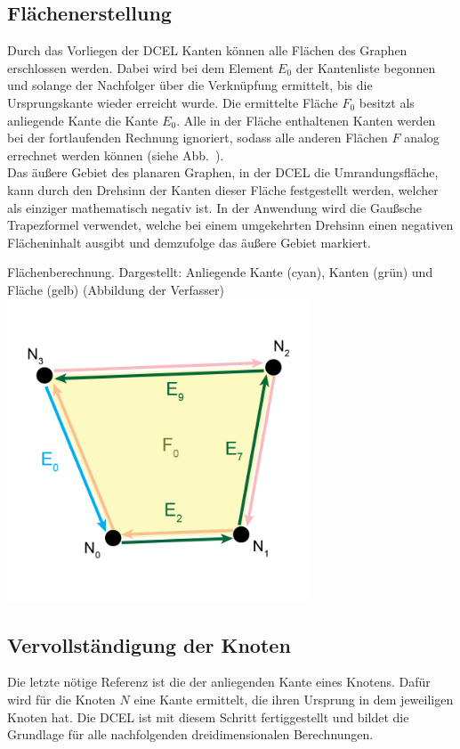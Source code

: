 \subsection{Flächenerstellung}
Durch das Vorliegen der DCEL Kanten können alle Flächen des Graphen erschlossen werden.
Dabei wird bei dem Element $E_0$ der Kantenliste begonnen und solange der Nachfolger über die Verknüpfung ermittelt, bis die Ursprungskante wieder erreicht wurde.
Die ermittelte Fläche $F_0$ besitzt als anliegende Kante die Kante $E_0$.
Alle in der Fläche enthaltenen Kanten werden bei der fortlaufenden Rechnung ignoriert, sodass alle anderen Flächen $F$ analog errechnet werden können (siehe Abb.~\thebildnrnext). \\
Das äußere Gebiet des planaren Graphen, in der DCEL die Umrandungsfläche, kann durch den Drehsinn der Kanten dieser Fläche festgestellt werden, welcher als einziger mathematisch negativ ist.
In der Anwendung wird die Gaußsche Trapezformel verwendet, welche bei einem umgekehrten Drehsinn einen negativen Flächeninhalt ausgibt und demzufolge das äußere Gebiet markiert. \\

\begin{Bild}{Flächenberechnung. Dargestellt: Anliegende Kante (cyan), Kanten (grün) und Fläche (gelb) (Abbildung der Verfasser)}
	\includegraphics[width = 90mm]{Bilder/FlaecheBerechnung}
\end{Bild}

\subsection{Vervollständigung der Knoten}
Die letzte nötige Referenz ist die der anliegenden Kante eines Knotens.
Dafür wird für die Knoten $N$ eine Kante ermittelt, die ihren Ursprung in dem jeweiligen Knoten hat.
Die DCEL ist mit diesem Schritt fertiggestellt und bildet die Grundlage für alle nachfolgenden dreidimensionalen Berechnungen.\label{key}
